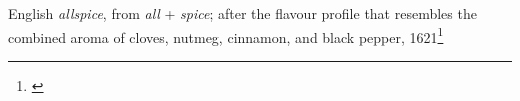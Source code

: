 \begin{etymology}\label{ety:allspice}
English \textit{allspice}, from \textit{all} + \textit{spice}; after the flavour profile that resembles the combined aroma of cloves, nutmeg, cinnamon, and black pepper, 1621\footnote{\textcite[allspice]{oed}}
\end{etymology}